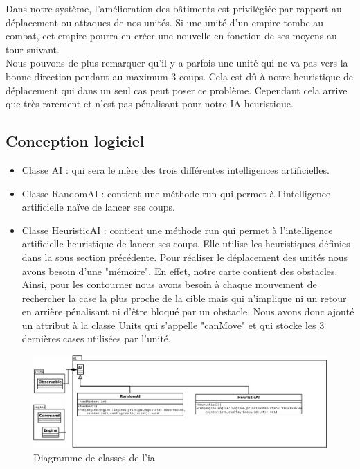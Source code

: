 \documentclass[12pt,a4paper]{article}
\begin{document}
Dans notre système, l'amélioration des bâtiments est privilégiée par rapport au déplacement ou attaques de nos unités. Si une unité d'un empire tombe au combat, cet empire pourra en créer une nouvelle en fonction de ses moyens au tour suivant.
\\Nous pouvons de plus remarquer qu'il y a parfois une unité qui ne va pas vers la bonne direction pendant au maximum 3 coups. Cela est dû à notre heuristique de déplacement qui dans un seul cas peut poser ce problème. Cependant cela arrive que très rarement et n'est pas pénalisant pour notre IA heuristique. 
\subsection{Conception logiciel}
\begin{itemize}
    \item Classe AI : qui sera le mère des trois différentes intelligences artificielles.
    \item Classe RandomAI : contient une méthode run qui permet à l'intelligence artificielle naïve de lancer ses coups. 
    \item Classe HeuristicAI : contient une méthode run qui permet à l'intelligence artificielle heuristique de lancer ses coups. Elle utilise les heuristiques définies dans la sous section précédente. Pour réaliser le déplacement des unités nous avons besoin d'une "mémoire". En effet, notre carte contient des obstacles. Ainsi, pour les contourner nous avons besoin à chaque mouvement de rechercher la case la plus proche de la cible mais qui n'implique ni un retour en arrière pénalisant ni d'être bloqué par un obstacle. Nous avons donc ajouté un attribut à la classe Units qui s'appelle "canMove" et qui stocke les 3 dernières cases utilisées par l'unité.
\end{itemize}
\newpage

\begin{figure}[!ht]
\centering
    \includegraphics[width=1\textwidth]{ressources/ai.png}
     \caption{Diagramme de classes de l'ia}
\end{figure}
\end{document}
